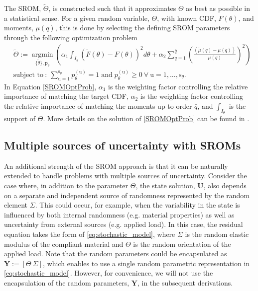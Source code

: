 The SROM, $\tilde{\Theta}$, is constructed such that it approximates $\Theta$ as best as possible in a statistical sense. For a given random variable, $\Theta$, with known CDF, $F(\theta)$, and moments, $\mu(q)$, this is done by selecting the defining SROM parameters through the following optimization problem
\begin{align}
&\tilde{\Theta} := \underset{\{\tilde{\theta}\},\bm{p}_{\theta}}{\operatorname{argmin}} \left(  \alpha_1 \int_{I_{\theta}}  \left( \tilde{F}(\theta) - F(\theta) \right)^2 d\theta + \alpha_2 \sum_{q=1}^{\bar{q}} \left( \frac{ (\tilde{\mu}(q) - \mu(q) )}{ \mu(q) }  \right)^2  \right) \label{SROMOptProb} 
\\
&\text{subject to}\ \colon\ \sum_{\mathrm{u}=1}^{\mathrm{s}_{\theta}} p_{\theta}^{(\mathrm{u})} = 1 \; \text{and} \; p_{\theta}^{(\mathrm{u})} \geq 0\ \forall \ \mathrm{u} = 1,...,\mathrm{s}_{\theta}. \nonumber
\end{align} 
In Equation \eqref{SROMOptProb}, $\alpha_1$ is the weighting factor controlling the relative importance of matching the target CDF, $\alpha_2$ is the weighting factor controlling the relative importance of matching the moments up to order $\bar{q}$, and $\int_{I_{\theta}}$ is the support of $\Theta$. More details on the solution of \eqref{SROMOptProb} can be found in \cite{warner2013stochastic}. 

\subsection{Multiple sources of uncertainty with SROMs}

An additional strength of the SROM approach is that it can be naturally extended to handle problems with multiple sources of uncertainty. Consider the case where, in addition to the parameter $\Theta$, the state solution, $\bm U$, also depends on a separate and independent source of randomness represented by the random element $\Sigma$. This could occur, for example, when the variability in the state is influenced by both internal randomness (e.g. material properties) as well as uncertainty from external sources (e.g. applied load). In this case, the residual equation takes the form of \eqref{eq:stochastic_model}, where $\Sigma$ is the random elastic modulus of the compliant material and $\Theta$ is the random orientation of the applied load. Note that the random parameters could be encapsulated as $\bm Y:=[\Theta\ \Sigma]$, which enables to use a single random parametric representation in \eqref{eq:stochastic_model}. However, for convenience, we will not use the encapsulation of the random parameters, $\bm Y$, in the subsequent derivations.\\

